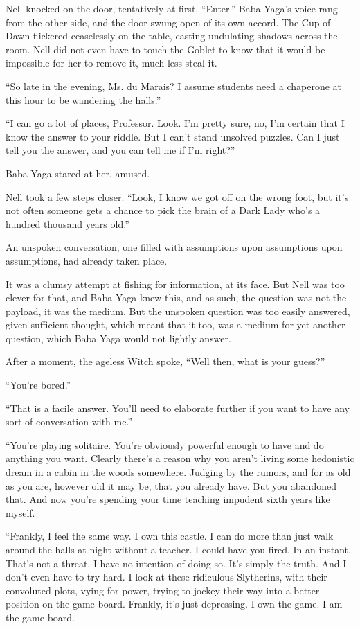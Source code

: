 \simpleline
{}

Nell knocked on the door, tentatively at first. “Enter.” Baba Yaga’s voice rang from the other side, and the door swung open of its own accord. The Cup of Dawn flickered ceaselessly on the table, casting undulating shadows across the room. Nell did not even have to touch the Goblet to know that it would be impossible for her to remove it, much less steal it.

“So late in the evening, Ms. du Marais? I assume students need a chaperone at this hour to be wandering the halls.”

“I can go a lot of places, Professor. Look. I’m pretty sure, no, I’m certain that I know the answer to your riddle. But I can’t stand unsolved puzzles. Can I just tell you the answer, and you can tell me if I’m right?”

Baba Yaga stared at her, amused.

Nell took a few steps closer. “Look, I know we got off on the wrong foot, but it’s not often someone gets a chance to pick the brain of a Dark Lady who’s a hundred thousand years old.”

An unspoken conversation, one filled with assumptions upon assumptions upon assumptions, had already taken place.

It was a clumsy attempt at fishing for information, at its face. But Nell was too clever for that, and Baba Yaga knew this, and as such, the question was not the payload, it was the medium. But the unspoken question was too easily answered, given sufficient thought, which meant that it too, was a medium for yet another question, which Baba Yaga would not lightly answer.

After a moment, the ageless Witch spoke, “Well then, what is your guess?”

“You’re bored.”

“That is a facile answer. You’ll need to elaborate further if you want to have any sort of conversation with me.”

“You’re playing solitaire. You’re obviously powerful enough to have and do anything you want. Clearly there’s a reason why you aren’t living some hedonistic dream in a cabin in the woods somewhere. Judging by the rumors, and for as old as you are, however old it may be, that you already have. But you abandoned that. And now you’re spending your time teaching impudent sixth years like myself.

“Frankly, I feel the same way. I own this castle. I can do more than just walk around the halls at night without a teacher. I could have you fired. In an instant. That’s not a threat, I have no intention of doing so. It’s simply the truth. And I don’t even have to try hard. I look at these ridiculous Slytherins, with their convoluted plots, vying for power, trying to jockey their way into a better position on the game board. Frankly, it’s just depressing. I own the game. I am the game board.

